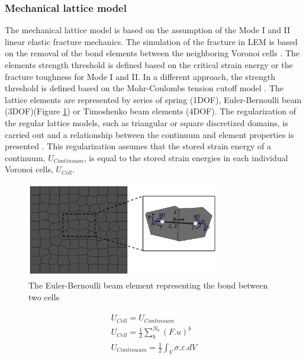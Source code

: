 \subsubsection*{Mechanical lattice model}

The mechanical lattice model is based on the assumption of the Mode I and II linear elastic fracture mechanics. The simulation of the fracture in LEM is based on the removal of the bond elements between the neighboring Voronoi cells \cite{Rizvietal2019a}. The elements strength threshold is defined based on the critical strain energy or the fracture toughness for Mode I and II. In a different approach, the strength threshold is defined based on the Mohr-Coulombs tension cutoff model \cite{Bolanderetal1998}. The lattice elements are represented by series of spring (1DOF),  Euler-Bernoulli beam (3DOF)(Figure \ref{fig:Amir_LEM_Beam}) or Timoshenko beam elements (4DOF). The regularization of the regular lattice models, such as triangular or square discretized domains, is carried out and a relationship between the continuum and element properties is presented \cite{Ostojastarzewski2002, Karihalooetal2003}. This regularization assumes that the stored strain energy of a continuum, $U_{Continuum}$, is equal to the stored strain energies in each individual Voronoi cells, $U_{Cell}$. 

\begin{figure}[!ht]
\centering
\includegraphics[width=0.75\textwidth]{figures/Amir_LEM_Beam.png}
\caption{The Euler-Bernoulli beam element representing the bond between two cells}
\label{fig:Amir_LEM_Beam}
\end{figure}

\begin{align}
\label{eq:LEM_Mechanical_1}
\begin{split}
 U_{Cell}=U_{Continuum}\\
 U_{Cell}=\frac{1}{2}\sum_{b}^{N_b}\left(F.u\right)^b\\
 U_{Continuum}=\frac{1}{2}\int_{V}{\sigma.\varepsilon.dV}
\end{split}
\end{align}

